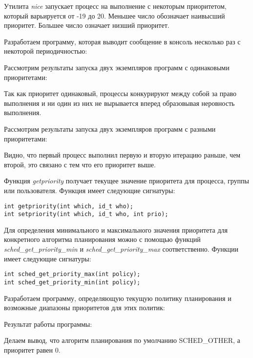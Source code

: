 \documentclass[14pt,a4paper,report]{report}
\begin{document}
Утилита \emph{nice} запускает процесс на выполнение с некоторым приоритетом, который варьируется от -19 до 20. Меньшее число обозначает наивысший приоритет. Большее число означает низший приоритет.

Разработаем программу, которая выводит сообщение в консоль несколько раз с некоторой периодичностью:



Рассмотрим результаты запуска двух экземпляров программ с одинаковыми приоритетами:



Так как приоритет одинаковый, процессы конкурируют между собой за право выполнения и ни один из них не вырывается вперед образовывая неровность выполнения.

Рассмотрим результаты запуска двух экземпляров программ с разными приоритетами:



Видно, что первый процесс выполнил первую и вторую итерацию раньше, чем второй, это связано с тем что его приоритет выше.

Функция \emph{getpriority} получает текущее значение приоритета для процесса, группы или пользователя. Функция имеет следующие сигнатуры:

\begin{verbatim}
int getpriority(int which, id_t who);
int setpriority(int which, id_t who, int prio);
\end{verbatim}

Для определения минимального и максимального значения приоритета для конкретного алгоритма планирования можно с помощью функций \emph{sched\_get\_priority\_min} и \emph{sched\_get\_priority\_max} соответственно. Функции имеет следующие сигнатуры:

\begin{verbatim}
int sched_get_priority_max(int policy);
int sched_get_priority_min(int policy);
\end{verbatim}

Разработаем программу, определяющую текущую политику планирования и возможные диапазоны приоритетов для этих политик:



Результат работы программы:



Делаем вывод, что алгоритм планирования по умолчанию SCHED\_OTHER, а приоритет равен 0.
\end{document}
